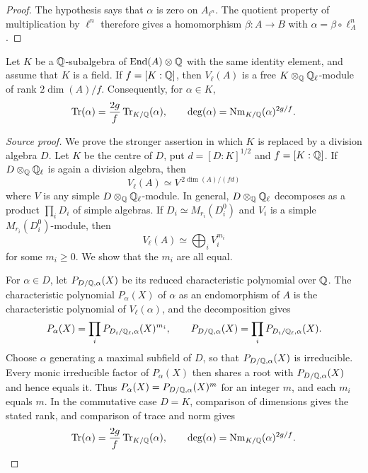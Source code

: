 \begin{proof}
The hypothesis says that $\alpha$ is zero on $A_{\ell^n}$.  The quotient
property of multiplication by $\ell^n$ therefore gives a homomorphism
$\beta:A\to B$ with $\alpha=\beta\circ\ell_A^n$.
\end{proof}

\begin{proposition}
\label{prop:milne-endomorphism-field-characteristic}

Let $K$ be a $\mathbb{Q}$-subalgebra of $\operatorname{End}(A)\otimes\mathbb{Q}$ with the same identity
element, and assume that $K$ is a field.  If $f=[K:\mathbb{Q}]$, then $V_\ell(A)$ is
a free $K\otimes_{\mathbb{Q}}\mathbb{Q}_\ell$-module of rank $2\dim(A)/f$.  Consequently, for
$\alpha\in K$,
\[
\operatorname{Tr}(\alpha)=\frac{2g}{f}\operatorname{Tr}_{K/\mathbb{Q}}(\alpha),
\qquad
\deg(\alpha)=\operatorname{Nm}_{K/\mathbb{Q}}(\alpha)^{2g/f}.
\]
\end{proposition}

\begin{proof}[Source proof]
We prove the stronger assertion in which $K$ is replaced by a division
algebra $D$.  Let $K$ be the centre of $D$, put
$d=[D:K]^{1/2}$ and $f=[K:\mathbb{Q}]$.  If $D\otimes_{\mathbb{Q}}\mathbb{Q}_\ell$ is again a division
algebra, then
\[
V_\ell(A)\simeq V^{\,2\dim(A)/(f d)}
\]
where $V$ is any simple $D\otimes_{\mathbb{Q}}\mathbb{Q}_\ell$-module.  In general,
$D\otimes_{\mathbb{Q}}\mathbb{Q}_\ell$ decomposes as a product $\prod_iD_i$ of simple
algebras.  If $D_i\simeq M_{r_i}(D_i^0)$ and $V_i$ is a simple
$M_{r_i}(D_i^0)$-module, then
\[
V_\ell(A)\simeq\bigoplus_i V_i^{m_i}
\]
for some $m_i\geq0$.  We show that the $m_i$ are all equal.

For $\alpha\in D$, let $P_{D/\mathbb{Q},\alpha}(X)$ be its reduced
characteristic polynomial over $\mathbb{Q}$.  The characteristic polynomial
$P_\alpha(X)$ of $\alpha$ as an endomorphism of $A$ is the characteristic
polynomial of $V_\ell(\alpha)$, and the decomposition gives
\[
P_\alpha(X)=\prod_iP_{D_i/\mathbb{Q}_\ell,\alpha}(X)^{m_i},
\qquad
P_{D/\mathbb{Q},\alpha}(X)=\prod_iP_{D_i/\mathbb{Q}_\ell,\alpha}(X).
\]
Choose $\alpha$ generating a maximal subfield of $D$, so that
$P_{D/\mathbb{Q},\alpha}(X)$ is irreducible.  Every monic irreducible factor of
$P_\alpha(X)$ then shares a root with $P_{D/\mathbb{Q},\alpha}(X)$ and hence equals
it.  Thus $P_\alpha(X)=P_{D/\mathbb{Q},\alpha}(X)^m$ for an integer $m$, and each
$m_i$ equals $m$.  In the commutative case $D=K$, comparison of dimensions
gives the stated rank, and comparison of trace and norm gives
\[
\operatorname{Tr}(\alpha)=\frac{2g}{f}\operatorname{Tr}_{K/\mathbb{Q}}(\alpha),\qquad
\deg(\alpha)=\operatorname{Nm}_{K/\mathbb{Q}}(\alpha)^{2g/f}.
\]
\end{proof}

